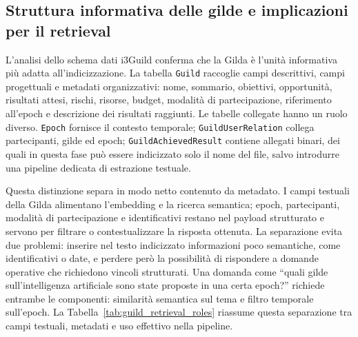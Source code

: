 \subsection{Struttura informativa delle gilde e implicazioni per il retrieval}
\label{subsec:guild_information_structure}

L'analisi dello schema dati i3Guild conferma che la Gilda è l'unità informativa
più adatta all'indicizzazione. La tabella \texttt{Guild} raccoglie campi
descrittivi, campi progettuali e metadati organizzativi: nome, sommario,
obiettivi, opportunità, risultati attesi, rischi, risorse, budget, modalità di
partecipazione, riferimento all'epoch e descrizione dei risultati raggiunti. Le
tabelle collegate hanno un ruolo diverso. \texttt{Epoch} fornisce il contesto
temporale; \texttt{GuildUserRelation} collega partecipanti, gilde ed epoch;
\texttt{GuildAchievedResult} contiene allegati binari, dei quali in questa fase
può essere indicizzato solo il nome del file, salvo introdurre una pipeline
dedicata di estrazione testuale.

Questa distinzione separa in modo netto contenuto da metadato. I campi testuali della Gilda
alimentano l'embedding e la ricerca semantica; epoch, partecipanti, modalità di
partecipazione e identificativi restano nel payload strutturato e servono per
filtrare o contestualizzare la risposta ottenuta. La separazione evita due problemi:
inserire nel testo indicizzato informazioni poco semantiche, come identificativi
o date, e perdere però la possibilità di rispondere a domande operative che
richiedono vincoli strutturati. Una domanda come ``quali gilde sull'intelligenza
artificiale sono state proposte in una certa epoch?'' richiede entrambe le
componenti: similarità semantica sul tema e filtro temporale sull'epoch.
La Tabella~\ref{tab:guild_retrieval_roles} riassume questa separazione tra
campi testuali, metadati e uso effettivo nella pipeline.

